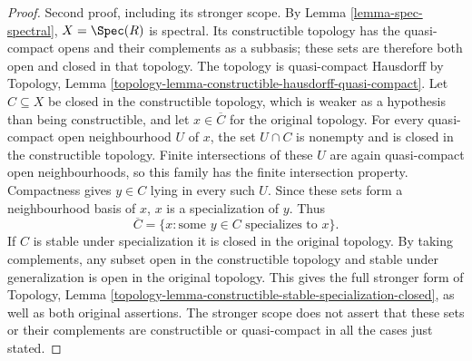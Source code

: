 \begin{proof}
\medskip\noindent
Second proof, including its stronger scope. By
Lemma \ref{lemma-spec-spectral}, $X=\Spec(R)$ is
spectral. Its constructible topology has the
quasi-compact opens and their complements as a
subbasis; these sets are therefore both open and
closed in that topology. The topology is
quasi-compact Hausdorff by Topology, Lemma
\ref{topology-lemma-constructible-hausdorff-quasi-compact}.
Let $C\subseteq X$ be closed in the constructible
topology, which is weaker as a hypothesis than
being constructible, and let $x\in\overline C$
for the original topology. For every quasi-compact
open neighbourhood $U$ of $x$, the set $U\cap C$
is nonempty and is closed in the constructible
topology. Finite intersections of these $U$ are
again quasi-compact open neighbourhoods, so this
family has the finite intersection property.
Compactness gives $y\in C$ lying in every such $U$.
Since these sets form a neighbourhood basis of $x$,
$x$ is a specialization of $y$. Thus
$$
\overline C=\{x:\text{some }y\in C\text{ specializes to }x\}.
$$
If $C$ is stable under specialization it is closed
in the original topology. By taking complements,
any subset open in the constructible topology
and stable under generalization is open in the
original topology. This gives the full stronger
form of Topology, Lemma
\ref{topology-lemma-constructible-stable-specialization-closed},
as well as both original assertions. The stronger
scope does not assert that these sets or their
complements are constructible or quasi-compact in
all the cases just stated.
\end{proof}